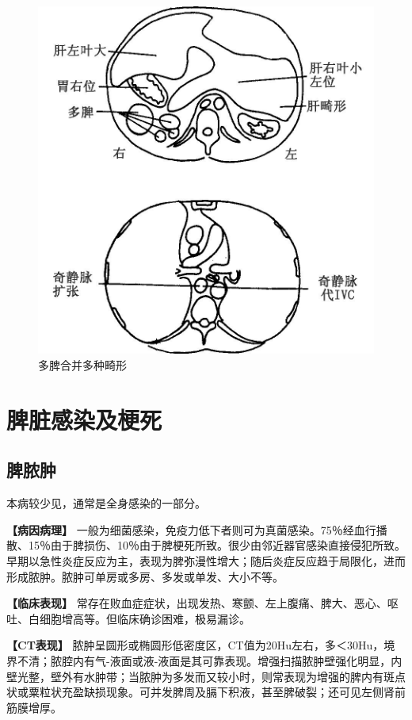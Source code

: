 \begin{figure}[!htbp]
 \centering
 \includegraphics[width=.7\textwidth,height=\textheight,keepaspectratio]{./images/Image00311.jpg}
 \captionsetup{justification=centering}
 \caption{多脾合并多种畸形}
 \label{fig14-3}
  \end{figure} 

\section{脾脏感染及梗死}

\subsection{脾脓肿}

本病较少见，通常是全身感染的一部分。

\textbf{【病因病理】}
一般为细菌感染，免疫力低下者则可为真菌感染。75％经血行播散、15％由于脾损伤、10％由于脾梗死所致。很少由邻近器官感染直接侵犯所致。早期以急性炎症反应为主，表现为脾弥漫性增大；随后炎症反应趋于局限化，进而形成脓肿。脓肿可单房或多房、多发或单发、大小不等。

\textbf{【临床表现】}
常存在败血症症状，出现发热、寒颤、左上腹痛、脾大、恶心、呕吐、白细胞增高等。但临床确诊困难，极易漏诊。

\textbf{【CT表现】}
脓肿呈圆形或椭圆形低密度区，CT值为20Hu左右，多＜30Hu，境界不清；脓腔内有气-液面或液-液面是其可靠表现。增强扫描脓肿壁强化明显，内壁光整，壁外有水肿带；当脓肿为多发而又较小时，则常表现为增强的脾内有斑点状或粟粒状充盈缺损现象。可并发脾周及膈下积液，甚至脾破裂；还可见左侧肾前筋膜增厚。

